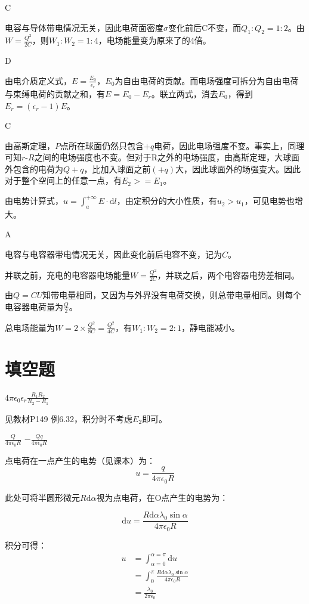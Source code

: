 \documentclass[b5paper,opensource,sourcefont,parskip]{qyxf-book}
\newcommand{\di}[1]{\mathrm{d}#1}
\begin{document}
C

\solve 电容与导体带电情况无关，因此电荷面密度$ \sigma $变化前后C不变，而$ Q_1:Q_2=1:2 $。由$ W=\frac{Q^2}{2C} $，则$ W_1:W_2=1:4 $，电场能量变为原来了的4倍。

D

\solve 由电介质定义式，$ E=\frac{E_0}{\epsilon_r} $，$ E_0 $为自由电荷的贡献。而电场强度可拆分为自由电荷与束缚电荷的贡献之和，有$ E=E_0-E_r $。联立两式，消去$ E_0 $，得到$ E_r=(\epsilon_r-1)E $。

C

\solve 由高斯定理，$P$点所在球面仍然只包含$ +q $电荷，因此电场强度不变。事实上，同理可知$r$-$R$之间的电场强度也不变。但对于R之外的电场强度，由高斯定理，大球面外包含的电荷为$ Q+q $，比加入球面之前$ (+q) $大，因此球面外的场强变大。因此对于整个空间上的任意一点，有$ E_2>=E_1 $。

由电势计算式，$ u=\int_a^{+\infty} E\cdot\di{l} $，由定积分的大小性质，有$ u_2>u_1 $，可见电势也增大。

A

\solve 电容与电容器带电情况无关，因此变化前后电容不变，记为$ C $。

并联之前，充电的电容器电场能量$ W=\frac{Q^2}{2C} $，并联之后，两个电容器电势差相同。

由$ Q=CU $知带电量相同，又因为与外界没有电荷交换，则总带电量相同。则每个电容器电荷量为$ \frac{Q}{2} $。

总电场能量为$ W=2\times \frac{Q^2}{8C}=\frac{Q^2}{4C} $，有$ W_1:W_2=2:1 $，静电能减小。

\section{填空题}
 $4\pi\epsilon_0\epsilon_r\frac{R_1R_2}{R_2-R_1}$

\solve 见教材P149 例6.32，积分时不考虑$E_2$即可。

 $\frac{Q}{4\pi\epsilon_0 R}$ \quad $-\frac{Qq}{4\pi\epsilon_0 R}$

\solve 点电荷在一点产生的电势（见课本）为：
\[u=\frac{q}{4\pi\epsilon_0 R}\]

此处可将半圆形微元$R\di{\alpha}$视为点电荷，在O点产生的电势为：

\[\di{u}=\frac{R\di{\alpha}\lambda_0\sin\alpha}{4\pi\epsilon_0 R}\]

积分可得：
\begin{align*}
u&=\int_{\alpha=0}^{\alpha=\pi} \di{u}\\
&=\int_0^{\pi} \frac{R\di{\alpha}\lambda_0\sin\alpha}{4\pi\epsilon_0 R}\\
&=\frac{\lambda_0}{2\pi\epsilon_0}
\end{align*}
\end{document}
